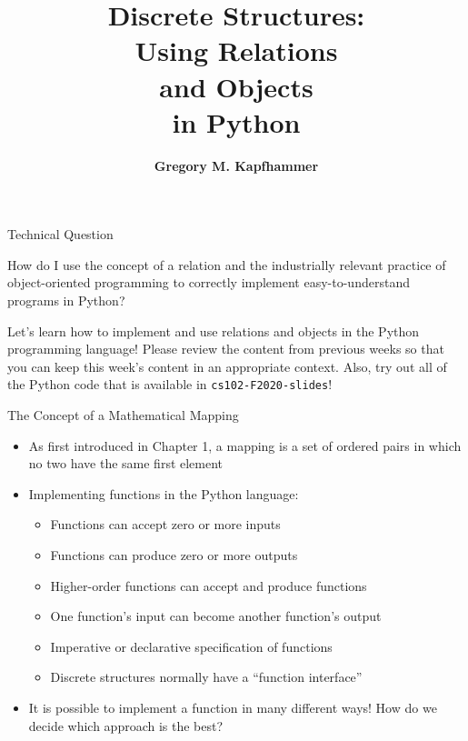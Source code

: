 \documentclass[14pt,aspectratio=169]{beamer}
\title{\vspace*{-.25in}Discrete Structures: \\ Using Relations\\ and Objects\\ in Python}
\author{{\bf Gregory M. Kapfhammer}}
\institute[shortinst]{{\bf Department of Computer Science, Allegheny College}}
\begin{document}
{
  \begin{frame}
    \titlepage
  \end{frame}
}

%
\begin{frame}{Technical Question}
  \hspace*{.25in}
  \begin{minipage}{5in}
    \vspace*{.1in}
    \begin{center}
      {\large How do I use the concept of a relation and the industrially
      relevant practice of object-oriented programming to correctly implement
      easy-to-understand programs in Python?}
    \end{center}
  \end{minipage}
  \vspace{2ex}
  \begin{center}
    \small Let's learn how to implement and use relations and objects in the
    Python programming language! Please review the content from previous weeks
    so that you can keep this week's content in an appropriate context. Also,
    try out all of the Python code that is available in {\tt cs102-F2020-slides}!
  \end{center}
\end{frame}

%
\begin{frame}{The Concept of a Mathematical Mapping}
  \begin{itemize}
    \item As first introduced in Chapter 1, a mapping is a set of ordered pairs
      in which no two have the same first element
      \vspace*{-.15in}
    \item Implementing functions in the Python language:
      \begin{itemize}
        \item Functions can accept zero or more inputs
        \item Functions can produce zero or more outputs
        \item Higher-order functions can accept and produce functions
        \item One function's input can become another function's output
        \item Imperative or declarative specification of functions
        \item Discrete structures normally have a ``function interface''
      \end{itemize}
      \vspace*{-.2in}
    \item It is possible to implement a function in many different ways! How do
      we decide which approach is the best?
  \end{itemize}
\end{frame}
\end{document}
